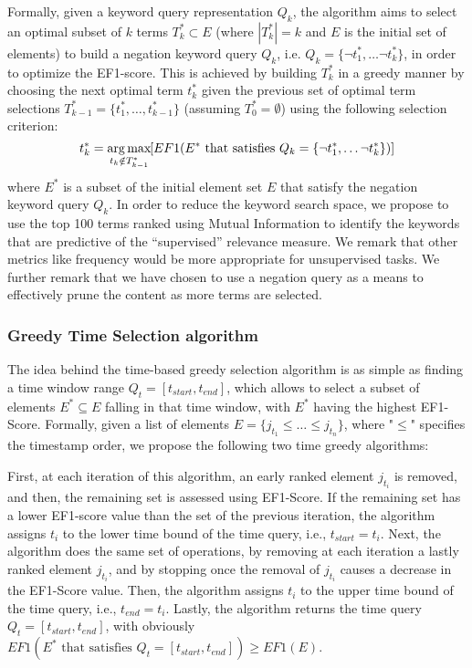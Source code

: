 Formally, given a keyword query representation $Q_k$, the algorithm aims to select an
optimal subset of $k$ terms $T_{k}^{*}\subset E$ (where $|T_{k}^{*}|=k$ and $E$ is the initial set of elements) to build a negation keyword query $Q_k$, i.e. $Q_k=\{\neg t_{1}^{*},\dots \neg t_{k}^{*}\}$, in order to optimize the EF1-score. This is achieved by
building $T_{k}^{*}$ in a greedy manner by choosing the next optimal
term $t_{k}^{*}$ given the previous set of optimal term selections
$T_{k-1}^{*}=\{t_{1}^{*},\ldots,t_{k-1}^{*}\}$ (assuming $T_{0}^{*}=\emptyset$)
using the following selection criterion:
\begin{equation}
t_{k}^{*}=\operatorname*{arg\,max}_{t_{k}\notin T_{k-1}^{*}}\hspace{-0.3mm}[EF1(E^{*} \textrm{ that satisfies } Q_k=\{\neg t_{1}^{*},\dots \neg t_{k}^{*}\})]
\end{equation}
where  $E^{*}$ is a subset of the initial element set $E$ that satisfy the negation keyword query $Q_k$. In order to reduce the keyword search space, we propose to use the top 100 terms ranked using Mutual Information to identify the keywords that are predictive of the ``supervised'' relevance measure.  We remark that other metrics like frequency would be more appropriate for unsupervised tasks.  We further remark that we have chosen to use a negation query as a means to effectively prune the content as more terms are selected.  

\subsubsection{Greedy Time Selection algorithm}

The idea behind the time-based greedy selection algorithm is as simple as finding a time window range $Q_t=[t_{start},t_{end}]$, which allows to select a subset of elements $E^{*}\subseteq E$ falling in that time window, with $E^{*}$ having the highest EF1-Score. 
Formally, given a list of elements $E=\{j_{t_1}\leq \dots \leq j_{t_n}\}$, where "$\leq$" specifies the timestamp order, we propose the following two time greedy algorithms:

 First, at each iteration of this algorithm, an early ranked element $j_{t_i}$ is removed, and then, the remaining set is assessed using EF1-Score. If the remaining set has a lower EF1-score value than the set of the previous iteration, the algorithm assigns $t_i$ to the lower time bound of the time query, i.e., $t_{start}=t_i$. 
Next, the algorithm does the same set of operations, by removing at each iteration a lastly ranked element  $j_{t_i}$, and by stopping once the removal of  $j_{t_i}$ causes a decrease in the EF1-Score value. Then, the algorithm assigns $t_i$ to the upper time bound of the time query, i.e., $t_{end}=t_i$. 
Lastly, the algorithm returns the  time query $Q_t=[t_{start},t_{end}]$, with obviously $EF1(E^{*} \textrm{ that satisfies } Q_t=[t_{start},t_{end}]) \geq EF1(E)$.

